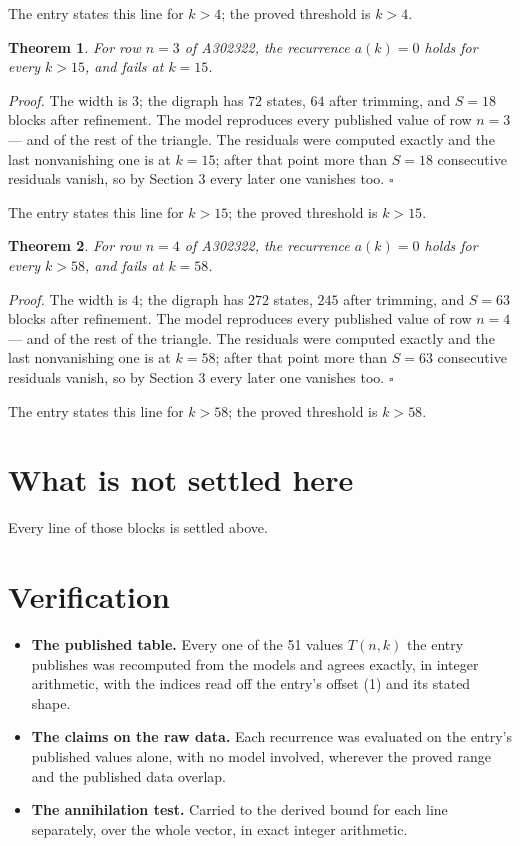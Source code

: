\documentclass[11pt]{article}
\newtheorem{theorem}{Theorem}
\theoremstyle{definition}
\begin{document}
The entry states this line for $k > 4$; the proved threshold is $k > 4$.

\begin{theorem} For row $n = 3$ of A302322, the recurrence $a(k) = 0$ holds for every $k > 15$, and fails at $k = 15$.\end{theorem}

{\itshape Proof.} The width is $3$; the digraph has $72$ states, $64$ after trimming, and $S = 18$ blocks after refinement. The model reproduces every published value of row $n = 3$ --- and of the rest of the triangle. The residuals were computed exactly and the last nonvanishing one is at $k = 15$; after that point more than $S = 18$ consecutive residuals vanish, so by Section 3 every later one vanishes too. $\square$

The entry states this line for $k > 15$; the proved threshold is $k > 15$.

\begin{theorem} For row $n = 4$ of A302322, the recurrence $a(k) = 0$ holds for every $k > 58$, and fails at $k = 58$.\end{theorem}

{\itshape Proof.} The width is $4$; the digraph has $272$ states, $245$ after trimming, and $S = 63$ blocks after refinement. The model reproduces every published value of row $n = 4$ --- and of the rest of the triangle. The residuals were computed exactly and the last nonvanishing one is at $k = 58$; after that point more than $S = 63$ consecutive residuals vanish, so by Section 3 every later one vanishes too. $\square$

The entry states this line for $k > 58$; the proved threshold is $k > 58$.

\section{What is not settled here}

Every line of those blocks is settled above.

\section{Verification}

\begin{itemize}

\item {\bfseries The published table.} Every one of the 51 values $T(n,k)$ the entry publishes was recomputed from the models and agrees exactly, in integer arithmetic, with the indices read off the entry's offset (1) and its stated shape.

\item {\bfseries The claims on the raw data.} Each recurrence was evaluated on the entry's published values alone, with no model involved, wherever the proved range and the published data overlap.

\item {\bfseries The annihilation test.} Carried to the derived bound for each line separately, over the whole vector, in exact integer arithmetic.

\end{itemize}
\end{document}
